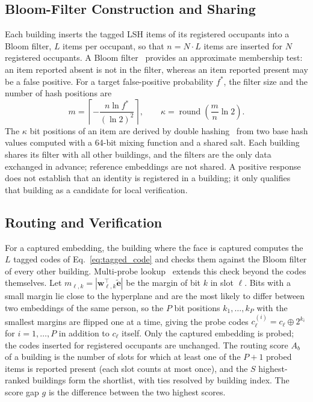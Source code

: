 \documentclass[pdflatex,sn-mathphys-num]{sn-jnl}%
\theoremstyle{thmstyleone}%
\theoremstyle{thmstyletwo}%
\theoremstyle{thmstylethree}%
\begin{document}
\subsection{Bloom-Filter Construction and Sharing}
\label{subsec:bloom_filter}

Each building inserts the tagged LSH items of its registered occupants into a Bloom filter, $L$ items per occupant, so that $n=N\cdot L$ items are inserted for $N$ registered occupants. A Bloom filter~\cite{bloom1970} provides an approximate membership test: an item reported absent is not in the filter, whereas an item reported present may be a false positive. For a target false-positive probability $f^*$, the filter size and the number of hash positions are
\begin{equation}
    m =
    \left\lceil
    -\frac{n\ln f^*}{(\ln 2)^2}
    \right\rceil,
    \qquad
    \kappa =
    \operatorname{round}
    \left(\frac{m}{n}\ln 2\right).
    \label{eq:bloom_size}
\end{equation}
The $\kappa$ bit positions of an item are derived by double hashing~\cite{kirsch2006} from two base hash values computed with a 64-bit mixing function and a shared salt. Each building shares its filter with all other buildings, and the filters are the only data exchanged in advance; reference embeddings are not shared. A positive response does not establish that an identity is registered in a building; it only qualifies that building as a candidate for local verification.

\subsection{Routing and Verification}
\label{subsec:routing_verification}

For a captured embedding, the building where the face is captured computes the $L$ tagged codes of Eq.~\eqref{eq:tagged_code} and checks them against the Bloom filter of every other building. Multi-probe lookup~\cite{lv2007} extends this check beyond the codes themselves. Let $m_{\ell,k}=|\mathbf{w}_{\ell,k}^\top\tilde{\mathbf{e}}|$ be the margin of bit $k$ in slot $\ell$. Bits with a small margin lie close to the hyperplane and are the most likely to differ between two embeddings of the same person, so the $P$ bit positions $k_1,\ldots,k_P$ with the smallest margins are flipped one at a time, giving the probe codes $c_\ell^{(i)}=c_\ell\oplus 2^{k_i}$ for $i=1,\ldots,P$ in addition to $c_\ell$ itself. Only the captured embedding is probed; the codes inserted for registered occupants are unchanged. The routing score $A_b$ of a building is the number of slots for which at least one of the $P+1$ probed items is reported present (each slot counts at most once), and the $S$ highest-ranked buildings form the shortlist, with ties resolved by building index. The score gap $g$ is the difference between the two highest scores.
\end{document}
